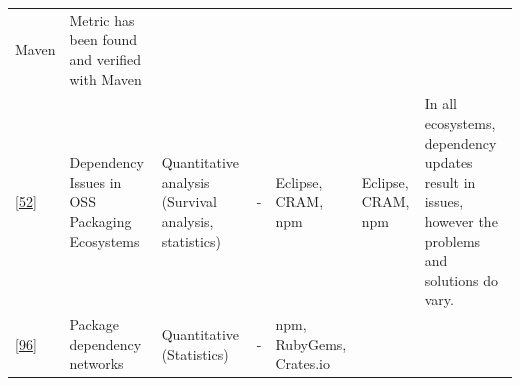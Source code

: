 \documentclass[]{book}
\begin{document}
\begin{longtable}[]{@{}lllllll@{}}
\begin{minipage}[t]{0.12\columnwidth}
Maven\strut
\end{minipage} & \begin{minipage}[t]{0.10\columnwidth}\raggedright\strut
Metric has been found and verified with Maven\strut
\end{minipage}\tabularnewline
\begin{minipage}[t]{0.09\columnwidth}\raggedright\strut
{[}\protect\hyperlink{ref-Decan2017}{52}{]}\strut
\end{minipage} & \begin{minipage}[t]{0.16\columnwidth}\raggedright\strut
Dependency Issues in OSS Packaging Ecosystems\strut
\end{minipage} & \begin{minipage}[t]{0.17\columnwidth}\raggedright\strut
Quantitative analysis (Survival analysis, statistics)\strut
\end{minipage} & \begin{minipage}[t]{0.07\columnwidth}\raggedright\strut
-\strut
\end{minipage} & \begin{minipage}[t]{0.10\columnwidth}\raggedright\strut
Eclipse, CRAM, npm\strut
\end{minipage} & \begin{minipage}[t]{0.12\columnwidth}\raggedright\strut
Eclipse, CRAM, npm\strut
\end{minipage} & \begin{minipage}[t]{0.10\columnwidth}\raggedright\strut
In all ecosystems, dependency updates result in issues, however the
problems and solutions do vary.\strut
\end{minipage}\tabularnewline
\begin{minipage}[t]{0.09\columnwidth}\raggedright\strut
{[}\protect\hyperlink{ref-Kikas2017}{96}{]}\strut
\end{minipage} & \begin{minipage}[t]{0.16\columnwidth}\raggedright\strut
Package dependency networks\strut
\end{minipage} & \begin{minipage}[t]{0.17\columnwidth}\raggedright\strut
Quantitative (Statistics)\strut
\end{minipage} & \begin{minipage}[t]{0.07\columnwidth}\raggedright\strut
-\strut
\end{minipage} & \begin{minipage}[t]{0.10\columnwidth}\raggedright\strut
npm, RubyGems, Crates.io\strut
\end{minipage} & \begin{minipage}[t]{0.12\columnwidth}\raggedright\strut

\end{minipage}
\end{longtable}
\end{document}
